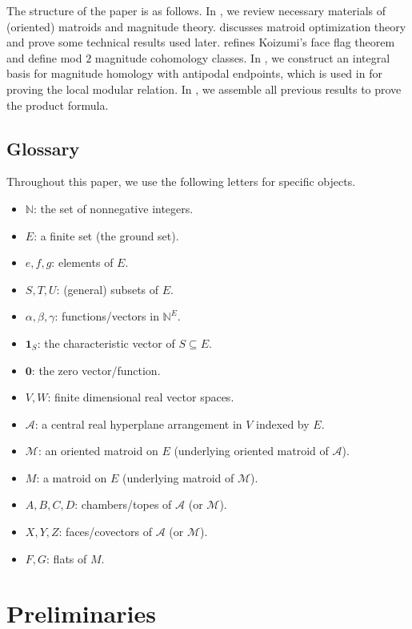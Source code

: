 \documentclass[10pt]{amsart}
\theoremstyle{plain}
\theoremstyle{definition}
\newcommand{\zero}{\mathbf{0}}
\newcommand{\one}{\mathbf{1}}
\newcommand{\NN}{\mathbb{N}}
\newcommand{\A}{\mathcal{A}}
\newcommand{\M}{\mathcal{M}}
\begin{document}
The structure of the paper is as follows. In , we review necessary materials of (oriented) matroids and magnitude theory.  discusses matroid optimization theory and prove some technical results used later.  refines Koizumi's face flag theorem and define mod $2$ magnitude cohomology classes. In , we construct an integral basis for magnitude homology with antipodal endpoints, which is used in  for proving the local modular relation. In , we assemble all previous results to prove the product formula.


\subsection*{Glossary} Throughout this paper, we use the following letters for specific objects.
\begin{itemize}
    \item $\NN$: the set of nonnegative integers.
    \item $E$: a finite set (the ground set).
    \item $e,f,g$: elements of $E$.
    \item $S,T,U$: (general) subsets of $E$.
    \item $\alpha,\beta,\gamma$: functions/vectors in $\NN^E$.
    \item $\one_S$: the characteristic vector of $S\subseteq E$.
    \item $\zero$: the zero vector/function.
    \item $V,W$: finite dimensional real vector spaces.
    \item $\A$: a central real hyperplane arrangement in $V$ indexed by $E$.
    \item $\M$: an oriented matroid on $E$ (underlying oriented matroid of $\A$).
    \item $M$: a matroid on $E$ (underlying matroid of $\M$).
    \item $A,B,C,D$: chambers/topes of $\A$ (or $\M$).
    \item $X,Y,Z$: faces/covectors of $\A$ (or $\M$).
    \item $F,G$: flats of $M$.
\end{itemize}

\section{Preliminaries}\label{prelim}
\end{document}
